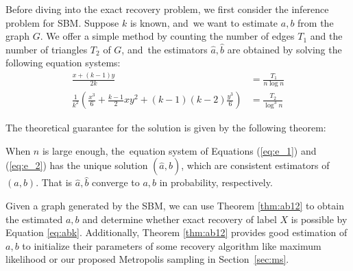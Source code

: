 \documentclass[entropy,article,accept,moreauthors,pdftex]{Definitions/mdpi}
\newcommand{\1}{\mathbbm{1}}
\begin{document}
Before diving into the exact recovery problem, we first consider the inference problem for SBM.
Suppose $k$ is known, and~we want to estimate $a,b$ from the graph $G$.
We offer a simple method
by counting the number of edges $T_1$ and the number of triangles $T_2$ of $G$, and~the estimators $\hat{a}, \hat{b}$ are
obtained by solving the following equation systems:
\begin{align}
\frac{x+(k-1)y}{2k} & = \frac{T_1}{n\log n} \label{eq:e_1}\\
\frac{1}{k^2}
\left(\frac{x^3}{6} + \frac{k-1}{2}xy^2 + (k-1)(k-2)\frac{y^3}{6}\right) & = \frac{T_2}{\log^3 n} \label{eq:e_2}
\end{align}

The theoretical guarantee for the solution is given by the following theorem:
\begin{Theorem}\label{thm:ab12}
When $n$ is large enough, the~equation system of Equations (\ref{eq:e_1}) and (\ref{eq:e_2}) has the  unique solution $(\hat{a}, \hat{b})$,
which are consistent estimators
of $(a,b)$. That is $\hat{a}, \hat{b}$ converge to $a,b$ in probability, respectively.
\end{Theorem}
Given a graph generated by the SBM, we can use Theorem \ref{thm:ab12} to obtain the estimated $a,b$ and determine whether
exact recovery of label $X$ is possible by Equation \eqref{eq:abk}. Additionally,  Theorem \ref{thm:ab12} provides good estimation of $a,b$ to initialize their parameters of
some recovery algorithm like maximum likelihood or our proposed Metropolis sampling in Section~\ref{sec:ms}.
\end{document}

